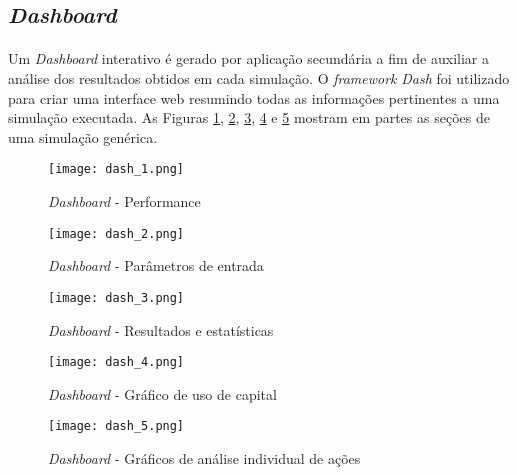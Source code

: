 \FloatBarrier
\subsection{\textit{Dashboard}}

\paragraph{} Um \textit{Dashboard} interativo é gerado por aplicação secundária a fim de auxiliar a análise dos resultados obtidos em cada simulação. O \textit{framework} \textit{Dash} \cite{dash} foi utilizado para criar uma interface web resumindo todas as informações pertinentes a uma simulação executada. As Figuras \ref{fig:171}, \ref{fig:172}, \ref{fig:173}, \ref{fig:174} e \ref{fig:175} mostram em partes as seções de uma simulação genérica.

\begin{figure}[!htb]
    \texttt{[image: dash\_1.png]}
    \centering
    \caption{\textit{Dashboard} - Performance}
    \label{fig:171}
\end{figure}

\begin{figure}[!htb]
    \texttt{[image: dash\_2.png]}
    \centering
    \caption{\textit{Dashboard} - Parâmetros de entrada}
    \label{fig:172}
\end{figure}

\begin{figure}[!htb]
    \texttt{[image: dash\_3.png]}
    \centering
    \caption{\textit{Dashboard} - Resultados e estatísticas}
    \label{fig:173}
\end{figure}

\begin{figure}[!htb]
    \texttt{[image: dash\_4.png]}
    \centering
    \caption{\textit{Dashboard} - Gráfico de uso de capital}
    \label{fig:174}
\end{figure}

\begin{figure}[!htb]
    \texttt{[image: dash\_5.png]}
    \centering
    \caption{\textit{Dashboard} - Gráficos de análise individual de ações }
    \label{fig:175}
\end{figure}






